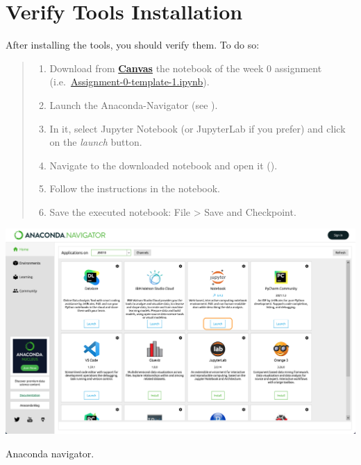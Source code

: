 \documentclass{latex-template/tufte-handout}
\begin{document}
\section{Verify Tools Installation}\label{verify-tools-installation}

After installing the tools, you should verify them. To do so:

\begin{quote}
\begin{enumerate}
\def\labelenumi{\arabic{enumi}.}
\item Download from \textbf{\href{https://canvas.vu.nl/courses/62909/assignments/220747}{Canvas}} the notebook of the week 0 assignment (i.e.~\href{https://canvas.vu.nl/courses/62909/assignments/220747}{Assignment-0-template-1.ipynb}).
\item Launch the Anaconda-Navigator (see ).
\item In it, select Jupyter Notebook (or JupyterLab if you prefer) and click
  on the \emph{launch} button.
\item Navigate to the downloaded notebook and open it ().
\item Follow the instructions in the notebook.
\item Save the executed notebook: File \textgreater{} Save and Checkpoint.
\end{enumerate}

\end{quote}

\begin{marginfigure}%
  \includegraphics[width=1.3\linewidth]{assets/06-launch-jupyter}
  \caption{Anaconda navigator.}
  \label{fig:anaconda-navigator}
\end{marginfigure}
\end{document}

